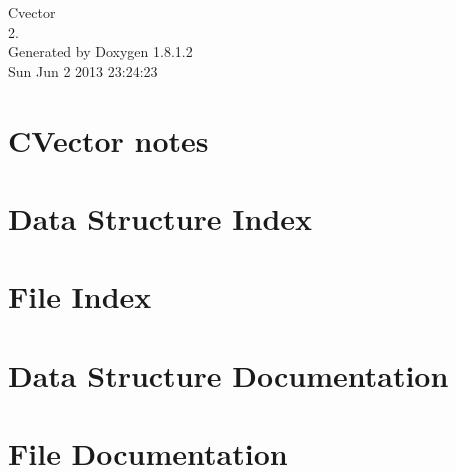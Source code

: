 \documentclass{book}
\begin{document}
\hypersetup{pageanchor=false,citecolor=blue}
\begin{titlepage}
\vspace*{7cm}
\begin{center}
{\Large Cvector \\[1ex]\large 2. }\\
\vspace*{1cm}
{\large Generated by Doxygen 1.8.1.2}\\
\vspace*{0.5cm}
{\small Sun Jun 2 2013 23:24:23}\\
\end{center}
\end{titlepage}
\clearemptydoublepage
{}
\tableofcontents
\clearemptydoublepage
{}
\hypersetup{pageanchor=true,citecolor=blue}
\chapter{C\-Vector notes}
\label{index}\hypertarget{index}{}
\chapter{Data Structure Index}

\chapter{File Index}

\chapter{Data Structure Documentation}








\chapter{File Documentation}















\printindex
\end{document}
